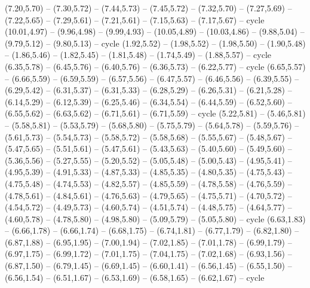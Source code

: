{  (7.20,5.70) -- (7.30,5.72) -- (7.44,5.73) -- (7.45,5.72) -- (7.32,5.70) -- (7.27,5.69) -- (7.22,5.65) -- (7.29,5.61) -- (7.21,5.61) -- (7.15,5.63) -- (7.17,5.67) -- cycle
  (10.01,4.97) -- (9.96,4.98) -- (9.99,4.93) -- (10.05,4.89) -- (10.03,4.86) -- (9.88,5.04) -- (9.79,5.12) -- (9.80,5.13) -- cycle
  (1.92,5.52) -- (1.98,5.52) -- (1.98,5.50) -- (1.90,5.48) -- (1.86,5.46) -- (1.82,5.45) -- (1.81,5.48) -- (1.74,5.49) -- (1.88,5.57) -- cycle}
\expandafter\def\csname geo:gebiet:BHS\endcsname{
  }
\expandafter\def\csname geo:gebiet:FLK\endcsname{
  }
\expandafter\def\csname geo:gebiet:NOR\endcsname{
  (6.35,5.78) -- (6.45,5.76) -- (6.40,5.76) -- (6.36,5.73) -- (6.22,5.77) -- cycle
  (6.65,5.57) -- (6.66,5.59) -- (6.59,5.59) -- (6.57,5.56) -- (6.47,5.57) -- (6.46,5.56) -- (6.39,5.55) -- (6.29,5.42) -- (6.31,5.37) -- (6.31,5.33) -- (6.28,5.29) -- (6.26,5.31) -- (6.21,5.28) -- (6.14,5.29) -- (6.12,5.39) -- (6.25,5.46) -- (6.34,5.54) -- (6.44,5.59) -- (6.52,5.60) -- (6.55,5.62) -- (6.63,5.62) -- (6.71,5.61) -- (6.71,5.59) -- cycle}
\expandafter\def\csname geo:gebiet:GRL\endcsname{
  (5.22,5.81) -- (5.46,5.81) -- (5.58,5.81) -- (5.53,5.79) -- (5.68,5.80) -- (5.75,5.79) -- (5.64,5.78) -- (5.59,5.76) -- (5.61,5.73) -- (5.54,5.73) -- (5.58,5.72) -- (5.58,5.68) -- (5.55,5.67) -- (5.48,5.67) -- (5.47,5.65) -- (5.51,5.61) -- (5.47,5.61) -- (5.43,5.63) -- (5.40,5.60) -- (5.49,5.60) -- (5.36,5.56) -- (5.27,5.55) -- (5.20,5.52) -- (5.05,5.48) -- (5.00,5.43) -- (4.95,5.41) -- (4.95,5.39) -- (4.91,5.33) -- (4.87,5.33) -- (4.85,5.35) -- (4.80,5.35) -- (4.75,5.43) -- (4.75,5.48) -- (4.74,5.53) -- (4.82,5.57) -- (4.85,5.59) -- (4.78,5.58) -- (4.76,5.59) -- (4.78,5.61) -- (4.84,5.61) -- (4.76,5.63) -- (4.79,5.65) -- (4.75,5.71) -- (4.70,5.72) -- (4.54,5.72) -- (4.49,5.73) -- (4.60,5.74) -- (4.51,5.74) -- (4.48,5.75) -- (4.64,5.77) -- (4.60,5.78) -- (4.78,5.80) -- (4.98,5.80) -- (5.09,5.79) -- (5.05,5.80) -- cycle}
\expandafter\def\csname geo:gebiet:ATF\endcsname{
  }
\expandafter\def\csname geo:gebiet:TLS\endcsname{
  }
\expandafter\def\csname geo:gebiet:ZAF\endcsname{
  (6.63,1.83) -- (6.66,1.78) -- (6.66,1.74) -- (6.68,1.75) -- (6.74,1.81) -- (6.77,1.79) -- (6.82,1.80) -- (6.87,1.88) -- (6.95,1.95) -- (7.00,1.94) -- (7.02,1.85) -- (7.01,1.78) -- (6.99,1.79) -- (6.97,1.75) -- (6.99,1.72) -- (7.01,1.75) -- (7.04,1.75) -- (7.02,1.68) -- (6.93,1.56) -- (6.87,1.50) -- (6.79,1.45) -- (6.69,1.45) -- (6.60,1.41) -- (6.56,1.45) -- (6.55,1.50) -- (6.56,1.54) -- (6.51,1.67) -- (6.53,1.69) -- (6.58,1.65) -- (6.62,1.67) -- cycle}
